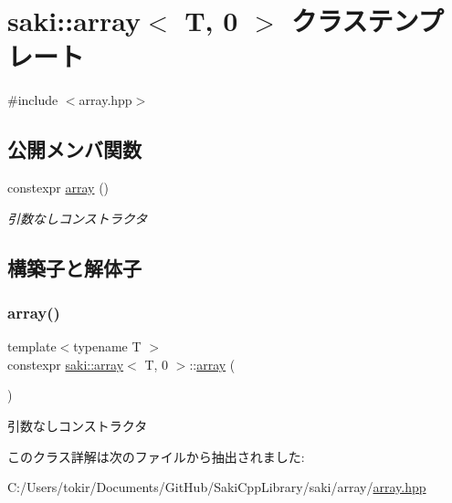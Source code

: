 \hypertarget{classsaki_1_1array_3_01_t_00_010_01_4}{}\section{saki\+:\+:array$<$ T, 0 $>$ クラステンプレート}
\label{classsaki_1_1array_3_01_t_00_010_01_4}


{\ttfamily \#include $<$array.\+hpp$>$}

\subsection*{公開メンバ関数}
\begin{DoxyCompactItemize}
\item 
constexpr \mbox{\hyperlink{classsaki_1_1array_3_01_t_00_010_01_4_ad873a55991e1ca757805bae4aaa3786d}{array}} ()
\begin{DoxyCompactList}\small\item\em 引数なしコンストラクタ \end{DoxyCompactList}\end{DoxyCompactItemize}


\subsection{構築子と解体子}
\mbox{\label{classsaki_1_1array_3_01_t_00_010_01_4_ad873a55991e1ca757805bae4aaa3786d}} 
\subsubsection{\texorpdfstring{array()}{array()}}
{\footnotesize\ttfamily template$<$typename T $>$ \\
constexpr \mbox{\hyperlink{classsaki_1_1array}{saki\+::array}}$<$ T, 0 $>$\+::\mbox{\hyperlink{classsaki_1_1array}{array}} (\begin{DoxyParamCaption}{ }\end{DoxyParamCaption})\hspace{0.3cm}{\ttfamily [inline]}}



引数なしコンストラクタ 



このクラス詳解は次のファイルから抽出されました\+:\begin{DoxyCompactItemize}
\item 
C\+:/\+Users/tokir/\+Documents/\+Git\+Hub/\+Saki\+Cpp\+Library/saki/array/\mbox{\hyperlink{array_2array_8hpp}{array.\+hpp}}\end{DoxyCompactItemize}
